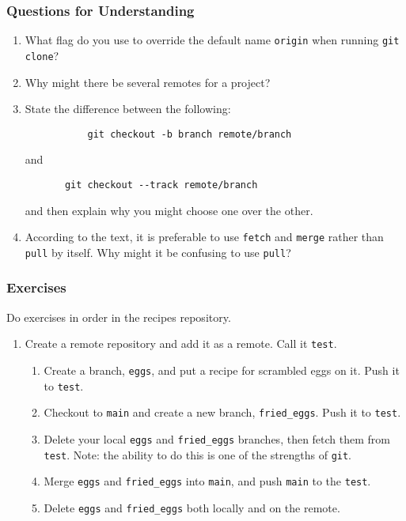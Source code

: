 \subsubsection{Questions for Understanding}
\begin{enumerate}
	\item What flag do you use to override the default name \verb`origin` when running
	   \verb`git clone`?
	\item Why might there be several remotes for a project?
	\item State the difference between the following:
	   \begin{verbatim}
		   git checkout -b branch remote/branch
	   \end{verbatim}
	   and
	   \begin{verbatim}
	   git checkout --track remote/branch
	   \end{verbatim}
	   and then explain why you might choose one over the other.
	\item According to the text, it is preferable to use \verb`fetch` and
	\verb`merge`
	   rather than \verb`pull` by itself.
	   Why might it be confusing to use \verb`pull`?
\end{enumerate}

\subsubsection{Exercises}
Do exercises in order in the recipes repository.
\begin{enumerate}
\item Create a remote repository and add it as a remote.
   Call it \verb`test`.
   \begin{enumerate}
	   \item Create a branch, \verb`eggs`, and put a recipe for scrambled eggs on it.
		  Push it to \verb`test`.
	   \item Checkout to \verb`main` and create a new branch, \verb`fried_eggs`.
		  Push it to \verb`test`.
	   \item Delete your local \verb`eggs` and \verb`fried_eggs` branches, then fetch them
		  from \verb`test`.
		  Note: the ability to do this is one of the strengths of \verb`git`.
	   \item Merge \verb`eggs` and \verb`fried_eggs` into \verb`main`, and
	   push \verb`main` to the
		  \verb`test`.
	   \item Delete \verb`eggs` and \verb`fried_eggs` both locally and on the remote.
    \end{enumerate}
\end{enumerate}
